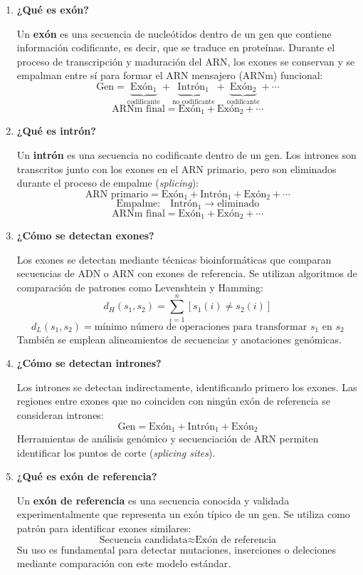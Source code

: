 \documentclass[fleqn,10pt]{article}
\begin{document}
\begin{enumerate}
    \item \textbf{¿Qué es exón?}
    
    Un \textbf{exón} es una secuencia de nucleótidos dentro de un gen que contiene información codificante, es decir, que se traduce en proteínas. Durante el proceso de transcripción y maduración del ARN, los exones se conservan y se empalman entre sí para formar el ARN mensajero (ARNm) funcional:
    \[
    \text{Gen} = \underbrace{\text{Exón}_1}_{\text{codificante}} + \underbrace{\text{Intrón}_1}_{\text{no codificante}} + \underbrace{\text{Exón}_2}_{\text{codificante}} + \cdots
    \]
    \[
    \text{ARNm final} = \text{Exón}_1 + \text{Exón}_2 + \cdots
    \]
    
    \item \textbf{¿Qué es intrón?}
    
    Un \textbf{intrón} es una secuencia no codificante dentro de un gen. Los intrones son transcritos junto con los exones en el ARN primario, pero son eliminados durante el proceso de empalme (\textit{splicing}):
    \[
    \text{ARN primario} = \text{Exón}_1 + \text{Intrón}_1 + \text{Exón}_2 + \cdots
    \]
    \[
    \text{Empalme:} \quad \text{Intrón}_1 \rightarrow \text{eliminado}
    \]
    \[
    \text{ARNm final} = \text{Exón}_1 + \text{Exón}_2 + \cdots
    \]
    
    \item \textbf{¿Cómo se detectan exones?}
    
    Los exones se detectan mediante técnicas bioinformáticas que comparan secuencias de ADN o ARN con exones de referencia. Se utilizan algoritmos de comparación de patrones como Levenshtein y Hamming:
    \[
    d_H(s_1, s_2) = \sum_{i=1}^{n} [s_1(i) \neq s_2(i)]
    \]
    \[
    d_L(s_1, s_2) = \text{mínimo número de operaciones para transformar } s_1 \text{ en } s_2
    \]
    También se emplean alineamientos de secuencias y anotaciones genómicas.
    
    \item \textbf{¿Cómo se detectan intrones?}
    
    Los intrones se detectan indirectamente, identificando primero los exones. Las regiones entre exones que no coinciden con ningún exón de referencia se consideran intrones:
    \[
    \text{Gen} = \text{Exón}_1 + \boxed{\text{Intrón}_1} + \text{Exón}_2
    \]
    Herramientas de análisis genómico y secuenciación de ARN permiten identificar los puntos de corte (\textit{splicing sites}).
    
    \item \textbf{¿Qué es exón de referencia?}
    
    Un \textbf{exón de referencia} es una secuencia conocida y validada experimentalmente que representa un exón típico de un gen. Se utiliza como patrón para identificar exones similares:
    \[
    \text{Secuencia candidata} \approx \text{Exón de referencia}
    \]
    Su uso es fundamental para detectar mutaciones, inserciones o deleciones mediante comparación con este modelo estándar.
\end{enumerate}
\end{document}
